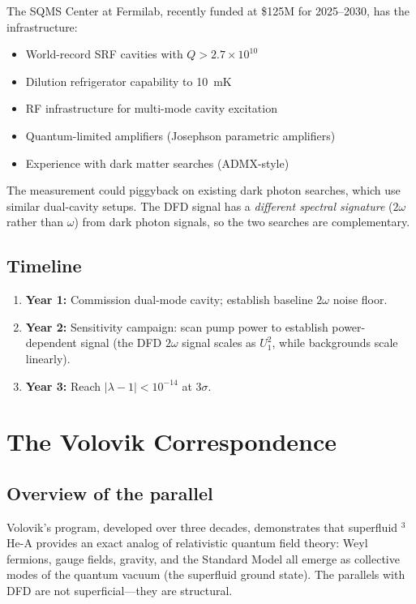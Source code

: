 \documentclass[aps,prd,twocolumn,superscriptaddress,nofootinbib]{revtex4-2}
\begin{document}
The SQMS Center at Fermilab, recently funded at \$125M for 2025--2030,
has the infrastructure:
\begin{itemize}
\item World-record SRF cavities with $Q > 2.7 \times 10^{10}$
\item Dilution refrigerator capability to 10~mK
\item RF infrastructure for multi-mode cavity excitation
\item Quantum-limited amplifiers (Josephson parametric amplifiers)
\item Experience with dark matter searches (ADMX-style)
\end{itemize}

The measurement could piggyback on existing dark photon searches,
which use similar dual-cavity setups.  The DFD signal has a
\emph{different spectral signature} ($2\omega$ rather than $\omega$)
from dark photon signals, so the two searches are complementary.

\subsection{Timeline}

\begin{enumerate}
\item \textbf{Year 1:} Commission dual-mode cavity; establish
  baseline $2\omega$ noise floor.
\item \textbf{Year 2:} Sensitivity campaign: scan pump power to
  establish power-dependent signal (the DFD $2\omega$ signal
  scales as $U_1^2$, while backgrounds scale linearly).
\item \textbf{Year 3:} Reach $|\lambda - 1| < 10^{-14}$ at
  $3\sigma$.
\end{enumerate}


\section{The Volovik Correspondence}
\label{sec:volovik}

\subsection{Overview of the parallel}

Volovik's program, developed over three decades, demonstrates that
superfluid $^3$He-A provides an exact analog of relativistic quantum
field theory: Weyl fermions, gauge fields, gravity, and the Standard
Model all emerge as collective modes of the quantum vacuum
(the superfluid ground state).  The parallels with DFD are not
superficial---they are structural.
\end{document}
